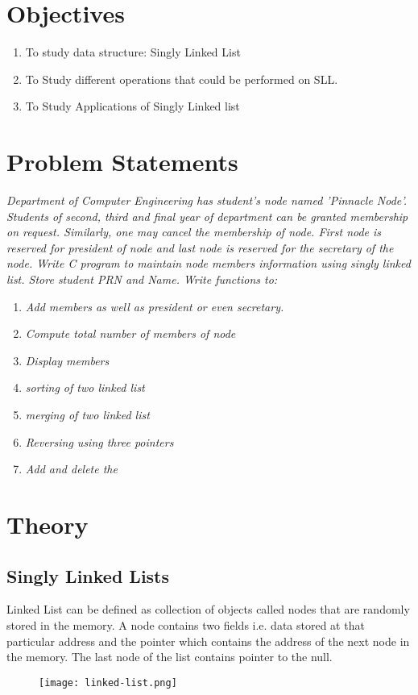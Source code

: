 \documentclass[11pt]{article}
\begin{document}
\tableofcontents
\thispagestyle{empty}
\clearpage
\setcounter{page}{1}

\section{Objectives}
\begin{enumerate}
	\item To study data structure: Singly Linked List
	\item To Study different operations that could be performed on SLL.
	\item To Study Applications of Singly Linked list
\end{enumerate}

\section{Problem Statements}
\textit{Department of Computer Engineering has student's node named 'Pinnacle Node'. Students of
	second, third and final year of department can be granted membership on request. Similarly, one
	may cancel the membership of node. First node is reserved for president of node and last node is
	reserved for the secretary of the node. Write C program to maintain node members information
	using singly linked list. Store student PRN and Name. Write functions to:}
\begin{enumerate}
	\item \textit{ Add members as well as president or even secretary.}
	\item \textit{ Compute total number of members of node }
	\item \textit{ Display members}
	\item \textit{ sorting of two linked list}
	\item \textit{ merging of two linked list}
	\item \textit{ Reversing using three pointers}
	\item \textit{ Add and delete the}
\end{enumerate}
\section{Theory}

\subsection{Singly Linked Lists}
Linked List can be defined as collection of objects called nodes that are randomly stored in the memory.
A node contains two fields i.e. data stored at that particular address and the pointer which contains the address of the next node in the memory.
The last node of the list contains pointer to the null.
\begin{figure}[H]
	\centering
	\texttt{[image: linked-list.png]}
\end{figure}
\end{document}
